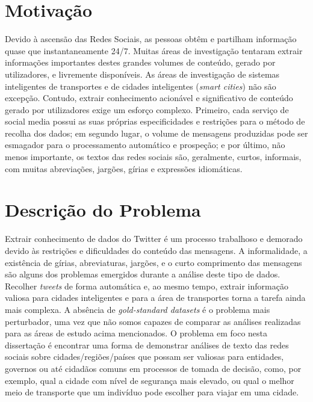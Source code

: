 \documentclass[9pt,a4paper]{extarticle}
\begin{document}
\begin{multicols}{2}

\section{Motivação}\label{sec:motivation}



Devido à ascensão das Redes Sociais, as pessoas obtêm e partilham informação quase que instantaneamente 24/7. Muitas áreas de investigação tentaram extrair informações importantes destes grandes volumes de conteúdo, gerado por utilizadores, e livremente disponíveis. As áreas de investigação de sistemas inteligentes de transportes e de cidades inteligentes (\textit{smart cities}) não são excepção. Contudo, extrair conhecimento acionável e significativo de conteúdo gerado por utilizadores exige um esforço complexo. Primeiro, cada serviço de social media possui as suas próprias especificidades e restrições para o método de recolha dos dados; em segundo lugar, o volume de mensagens produzidas pode ser esmagador para o processamento automático e prospeção; e por último, não menos importante, os textos das redes sociais são, geralmente, curtos, informais, com muitas abreviações, jargões, gírias e expressões idiomáticas.

\section{Descrição do Problema}
Extrair conhecimento de dados do Twitter é um processo trabalhoso e demorado devido às restrições e dificuldades do conteúdo das mensagens. A informalidade, a existência de gírias, abreviaturas, jargões, e o curto comprimento das mensagens são alguns dos problemas emergidos durante  a análise deste tipo de dados. Recolher \emph{tweets} de forma automática e, ao mesmo tempo, extrair informação valiosa para cidades inteligentes e para a área de transportes torna a tarefa ainda mais complexa.  A absência de \emph{gold-standard datasets} é o problema mais perturbador, uma vez que não somos capazes de comparar as análises realizadas para as áreas de estudo acima mencionados.
O problema em foco nesta dissertação é encontrar uma forma de demonstrar análises de texto das redes sociais sobre cidades/regiões/países que possam ser valiosas para entidades, governos ou até cidadãos comuns em processos de tomada de decisão, como, por exemplo, qual a cidade com nível de segurança mais elevado, ou qual o melhor meio de transporte que um indivíduo pode escolher para viajar em uma cidade.


\end{multicols}
\end{document}
